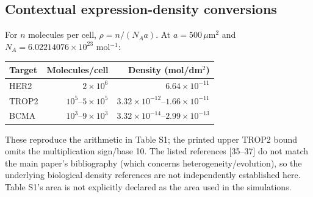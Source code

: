 \documentclass[11pt,a4paper]{article}
\begin{document}
\subsection{Contextual expression-density conversions}
For $n$ molecules per cell, $\rho=n/(N_Aa)$. At $a=500\,\mu$m$^2$ and $N_A=6.02214076\times10^{23}$ mol$^{-1}$:
\begin{center}\begin{tabular}{lrr}\toprule
Target & Molecules/cell & Density (mol/dm$^2$)\\\midrule
HER2 & $2\times10^6$ & $6.64\times10^{-11}$\\
TROP2 & $10^5$--$5\times10^5$ & $3.32\times10^{-12}$--$1.66\times10^{-11}$\\
BCMA & $10^3$--$9\times10^3$ & $3.32\times10^{-14}$--$2.99\times10^{-13}$\\\bottomrule
\end{tabular}\end{center}
These reproduce the arithmetic in Table S1; the printed upper TROP2 bound omits the multiplication sign/base 10. The listed references [35--37] do not match the main paper's bibliography (which concerns heterogeneity/evolution), so the underlying biological density references are not independently established here. Table S1's area is not explicitly declared as the area used in the simulations.
\end{document}
